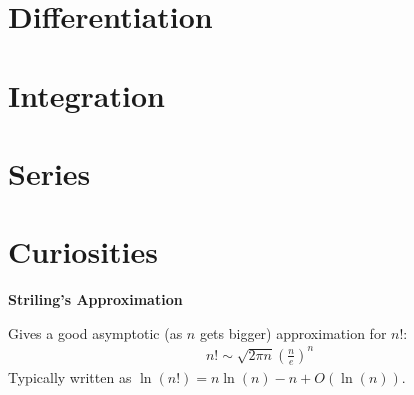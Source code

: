 \documentclass[a4paper, 12pt]{article}
\newcommand{\bt}[1]{\textbf{#1}} %
\newcommand{\eq}[1]{\begin{align*}#1\end{align*}} %
\renewcommand{\eq}[1]{\begin{align*}#1\end{align*}} %
\begin{document}
\section{Differentiation}

\section{Integration}

\section{Series}

\section*{Curiosities}

\bt{Striling's Approximation}

Gives a good asymptotic (as $n$ gets bigger) approximation for $n!$:\\

\eq{
n! \sim \sqrt{2\pi n} (\frac{n}{e})^n
}
Typically written as $\ln(n!) = n\ln(n) - n + O(\ln(n))$. 
\end{document}
